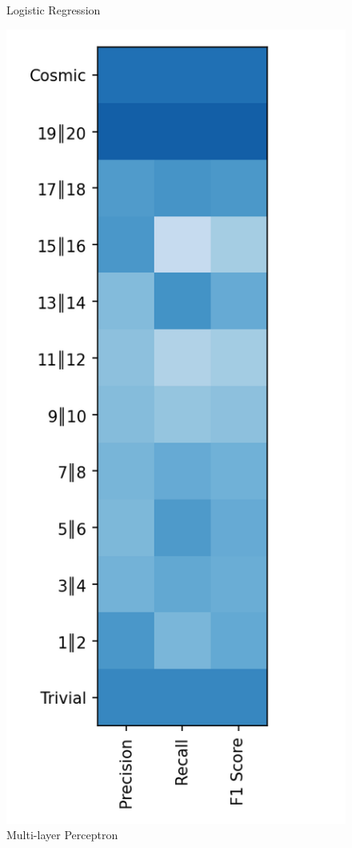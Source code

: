 \documentclass{article}
\begin{document}
\begin{figure}[ht]
\begin{minipage}[b]{0.32\linewidth}
			\caption*{Logistic Regression} 
			\vspace{10ex}
		\end{minipage}\hfill
		\begin{minipage}[b]{0.32\linewidth}
			\centering
			\includegraphics[width=\linewidth]{12 - Multi-layer Perceptron.png} 
			\caption*{Multi-layer Perceptron} 
			\vspace{10ex}
		\end{minipage}
	\end{figure}
\end{document}
